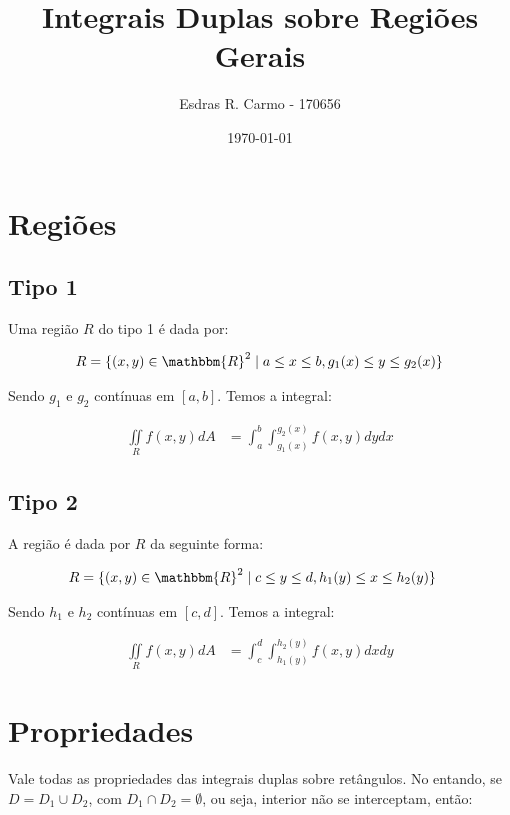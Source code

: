 \documentclass{article}
\author{Esdras R. Carmo - 170656}
\title{Integrais Duplas sobre Regiões Gerais}
\date{\today}
\newcommand{\doubleint}[1] {\iint\limits_R #1 dA}
\theoremstyle{definition}
\begin{document}
    \maketitle

    \section{Regiões}
        \subsection{Tipo 1}
            Uma região $R$ do tipo 1 é dada por:

            \begin{align*}
                R &= \{ (x, y) \in \mathbbm{R}^2 \mid a \leq x \leq b, g_1(x) \leq y \leq g_2(x) \}\\
            \end{align*}

            Sendo $g_1$ e $g_2$ contínuas em $[a, b]$. Temos a integral:

            \begin{align*}
                \doubleint{f(x,y)} &= \int_a^b \int_{g_1(x)}^{g_2(x)} f(x,y) dy dx
            \end{align*}

        \subsection{Tipo 2}
            A região é dada por $R$ da seguinte forma:

            \begin{align*}
                R &= \{ (x, y) \in \mathbbm{R}^2 \mid c \leq y \leq d, h_1(y) \leq x \leq h_2(y) \}
            \end{align*}

            Sendo $h_1$ e $h_2$ contínuas em $[c, d]$. Temos a integral:
            
            \begin{align*}
                \doubleint{f(x,y)} &= \int_c^d \int_{h_1(y)}^{h_2(y)} f(x,y) dx dy
            \end{align*}

    \section{Propriedades}
        Vale todas as propriedades das integrais duplas sobre retângulos. No entando, se $D = D_1 \cup D_2$, com
        $D_1 \cap D_2 = \emptyset$, ou seja, interior não se interceptam, então:
\end{document}
